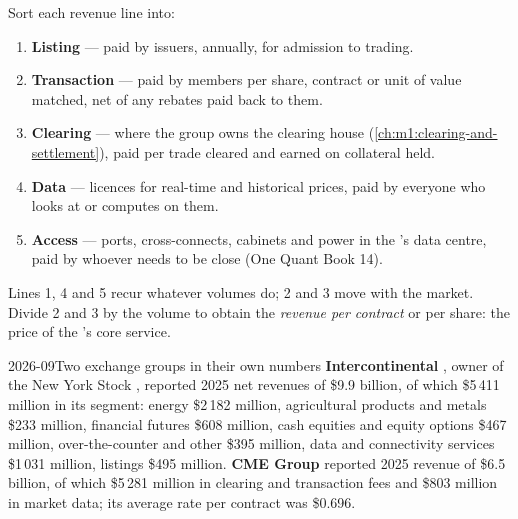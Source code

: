 \begin{method}\label{met:m1:exchanges-brokers-venues:products}
Sort each revenue line into:
\begin{enumerate}
\item \textbf{Listing} --- paid by issuers, annually, for admission to
  trading.
\item \textbf{Transaction} --- paid by members per share, contract or unit of
  value matched, net of any rebates paid back to them.
\item \textbf{Clearing} --- where the group owns the clearing house
  (\cref{ch:m1:clearing-and-settlement}), paid per trade cleared and earned
  on collateral held.
\item \textbf{Data} --- licences for real-time and historical prices, paid by
  everyone who looks at or computes on them.
\item \textbf{Access} --- ports, cross-connects, cabinets and power in the
  's data centre, paid by whoever needs to be close
  (One Quant Book 14).
\end{enumerate}
Lines 1, 4 and 5 recur whatever volumes do; 2 and 3 move with the market.
Divide 2 and 3 by the volume to obtain the \emph{revenue per contract} or
per share: the price of the 's core service.
\end{method}

\begin{dated}{2026-09}{Two exchange groups in their own numbers}\label{dat:m1:exchanges-brokers-venues:groups}
\textbf{Intercontinental }, owner of the New York Stock ,
reported 2025 net revenues of \$9.9 billion, of which \$5\,411 million in its
 segment: energy \$2\,182 million, agricultural products and metals
\$233 million, financial futures \$608 million, cash equities and equity
options \$467 million, over-the-counter and other \$395 million, data and
connectivity services \$1\,031 million, listings \$495 million.
\textbf{CME Group} reported 2025 revenue of \$6.5 billion, of which
\$5\,281 million in clearing and transaction fees and \$803 million in
market data; its average rate per contract was \$0.696.
\end{dated}

